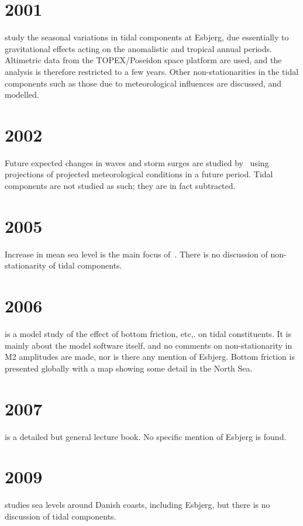 \documentclass[12pt,a4]{article}
\begin{document}
\section{2001}
\cite{Huess2001grl} study the seasonal variations in tidal components at Esbjerg, due essentially to gravitational effects acting on the anomalistic and tropical annual periods. Altimetric data from the TOPEX/Poseidon space platform are used, and the analysis is therefore restricted to a few years. Other non-stationarities in the tidal components such as those due to meteorological influences are discussed, and modelled.


\section{2002}
Future expected changes in waves and storm surges are studied by~\citep{Debernard2002} using projections of projected meteorological conditions in a future period. Tidal components are not studied as such; they are in fact subtracted.

\section{2005}
Increase in mean sea level is the main focus of~\cite{go05100g}. There is no discussion of non-stationarity of tidal components.

\section{2006}
\cite{Lyard2006} is a model study of the effect of bottom friction, etc,. on tidal constituents. It is mainly about the model software itself, and no comments on non-stationarity in M2 amplitudes are made, nor is there any mention of Esbjerg. Bottom friction is presented globally with a map showing some detail in the North Sea.

\section{2007}
\cite{Parker2007} is a detailed but general lecture book. No specific mention of Esbjerg is found.

\section{2009}
\cite{Madsen2009} studies sea levels around Danish coasts, including Esbjerg, but there is no discussion of tidal components.
\end{document}
